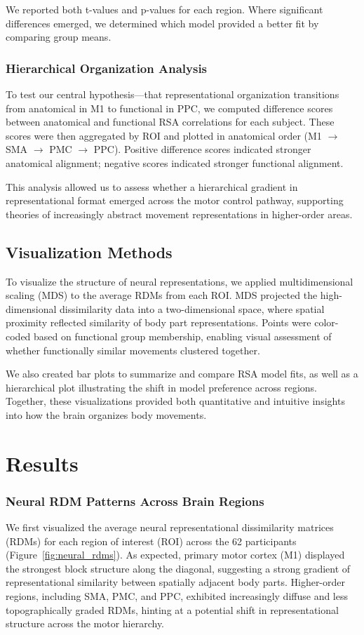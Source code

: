 \documentclass{article}
\begin{document}
We reported both t-values and p-values for each region. Where significant differences emerged, we determined which model provided a better fit by comparing group means.

\subsubsection{Hierarchical Organization Analysis}
To test our central hypothesis—that representational organization transitions from anatomical in M1 to functional in PPC, we computed difference scores between anatomical and functional RSA correlations for each subject. These scores were then aggregated by ROI and plotted in anatomical order (M1 $\rightarrow$ SMA $\rightarrow$ PMC $\rightarrow$ PPC). Positive difference scores indicated stronger anatomical alignment; negative scores indicated stronger functional alignment.

This analysis allowed us to assess whether a hierarchical gradient in representational format emerged across the motor control pathway, supporting theories of increasingly abstract movement representations in higher-order areas.

\subsection{Visualization Methods}
To visualize the structure of neural representations, we applied multidimensional scaling (MDS) to the average RDMs from each ROI. MDS projected the high-dimensional dissimilarity data into a two-dimensional space, where spatial proximity reflected similarity of body part representations. Points were color-coded based on functional group membership, enabling visual assessment of whether functionally similar movements clustered together.

We also created bar plots to summarize and compare RSA model fits, as well as a hierarchical plot illustrating the shift in model preference across regions. Together, these visualizations provided both quantitative and intuitive insights into how the brain organizes body movements.

\section{Results}
\subsubsection{Neural RDM Patterns Across Brain Regions}
We first visualized the average neural representational dissimilarity matrices (RDMs) for each region of interest (ROI) across the 62 participants (Figure~\ref{fig:neural_rdms}). As expected, primary motor cortex (M1) displayed the strongest block structure along the diagonal, suggesting a strong gradient of representational similarity between spatially adjacent body parts. Higher-order regions, including SMA, PMC, and PPC, exhibited increasingly diffuse and less topographically graded RDMs, hinting at a potential shift in representational structure across the motor hierarchy.
\end{document}
